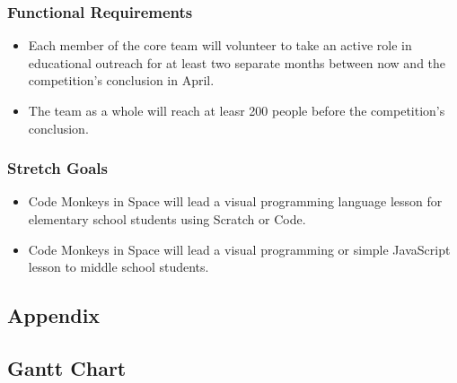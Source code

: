 \documentclass[onecolumn, draftclsnofoot, 10pt, compsoc]{IEEEtran}
\begin{document}
\subsubsection{Functional Requirements}
\begin{itemize}
\item Each member of the core team will volunteer to take an active role in educational outreach for at least two separate months between now and the competition's conclusion in April.
\item The team as a whole will reach at leasr 200 people before the competition's conclusion.
\end{itemize}
\subsubsection{Stretch Goals}
\begin{itemize}
\item Code Monkeys in Space will lead a visual programming language lesson for elementary school students using Scratch or Code.
\item Code Monkeys in Space will lead a visual programming or simple JavaScript lesson to middle school students.
\end{itemize}

\begin{landscape}
\section{Appendix}
\subsection{Gantt Chart}
\thispagestyle{empty}
\vspace*{\fill}
\noindent
\hspace*{-\oddsidemargin}%
\vspace*{\fill}
\vfill
\raisebox{-10pt}{\makebox[\linewidth]{\thepage}}
\end{landscape}
\end{document}
